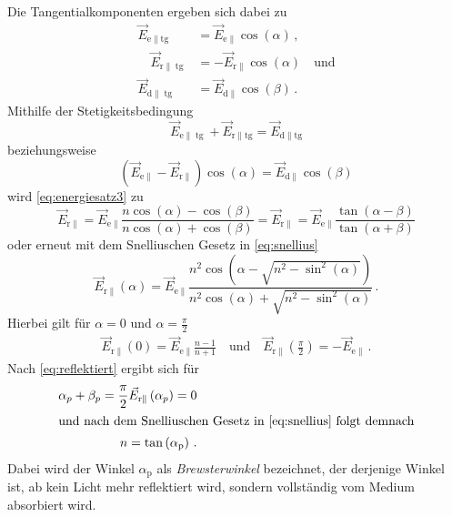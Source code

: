 Die Tangentialkomponenten ergeben sich dabei zu
\begin{align*}
    \vec{E}_{\mathrm{e} \| \mathrm{tg}} &= \vec{E}_{\mathrm{e} \|} \cos (\alpha) \, , \\
     \quad \vec{E}_{\mathrm{r} \| \operatorname{tg}} &= -\vec{E}_{\mathrm{r} \|} \cos (\alpha) \quad \text{und} \\ 
     \vec{E}_{\mathrm{d} \| \operatorname{tg}} &= \vec{E}_{\mathrm{d} \|} \cos (\beta) \, .
\end{align*}
Mithilfe der Stetigkeitsbedingung
\begin{equation*}
    \vec{E}_{\mathrm{e} \| \operatorname{tg}}+\vec{E}_{\mathrm{r} \| \mathrm{tg}}=\vec{E}_{\mathrm{d} \| \mathrm{tg}}
\end{equation*}
beziehungsweise
\begin{equation}
    \left(\vec{E}_{\mathrm{e} \|}-\vec{E}_{\mathrm{r} \|}\right) \cos (\alpha)=\vec{E}_{\mathrm{d} \|} \cos (\beta)
\end{equation}
wird \autoref{eq:energiesatz3} zu
\begin{equation} \label{eq:reflektiert}
    \vec{E}_{\mathrm{r} \|} 
    = \vec{E}_{\mathrm{e} \|} \frac{n \cos (\alpha)-\cos (\beta)}{n \cos (\alpha)+\cos (\beta)}
    = \vec{E}_{\mathrm{r} \|}=\vec{E}_{\mathrm{e} \|} \frac{\tan (\alpha-\beta)}{\tan (\alpha+\beta)}
\end{equation}
oder erneut mit dem Snelliuschen Gesetz in \autoref{eq:snellius}
\begin{equation} \label{eq:r_parallel}
    \vec{E}_{\mathrm{r} \|}(\alpha)=\vec{E}_{\mathrm{e} \|} \frac{n^{2} \cos \left(\alpha-\sqrt{n^{2}-\sin ^{2}(\alpha)}\right)}{n^{2} \cos (\alpha)+\sqrt{n^{2}-\sin ^{2}(\alpha)}} \, .
\end{equation}
Hierbei gilt für $\alpha = 0$ und $\alpha = \frac{\pi}{2}$
\begin{align*}
    \vec{E}_{\mathrm{r} \|}(0)=\vec{E}_{\mathrm{e} \|} \frac{n-1}{n+1} 
    \quad \text{und} \quad
    \vec{E}_{\mathrm{r} \|}\left(\frac{\pi}{2}\right)=-\vec{E}_{\mathrm{e} \|} \, .
\end{align*}
Nach \autoref{eq:reflektiert} ergibt sich für
\begin{align*}
    \alpha_{p} + \beta_{p} = \frac{\pi}{2} \vec{E}_{\mathrm{r} \|}\left(\alpha_{p}\right) = 0 \\
    \intertext{und nach dem Snelliuschen Gesetz in \autoref{eq:snellius} folgt demnach}
    n = \tan \left(\alpha_{\text{p}}\right) \, .
\end{align*}
Dabei wird der Winkel $\alpha_\text{p}$ als \textit{Brewsterwinkel} bezeichnet,
der derjenige Winkel ist, ab kein Licht mehr reflektiert wird, sondern vollständig vom Medium absorbiert wird.  